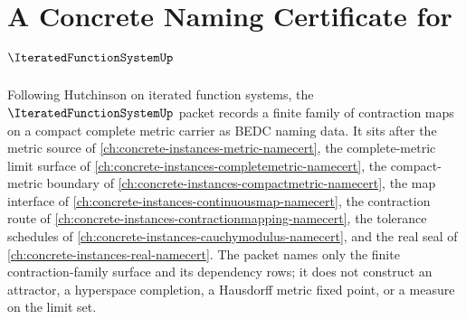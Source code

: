\chapter{A Concrete Naming Certificate for $\IteratedFunctionSystemUp$}
\label{ch:concrete-instances-iterated-function-system-namecert}

Following Hutchinson on iterated function systems, the $\IteratedFunctionSystemUp$ packet records a finite family of contraction maps on a compact complete metric carrier as BEDC naming data. It sits after the metric source of \autoref{ch:concrete-instances-metric-namecert}, the complete-metric limit surface of \autoref{ch:concrete-instances-completemetric-namecert}, the compact-metric boundary of \autoref{ch:concrete-instances-compactmetric-namecert}, the map interface of \autoref{ch:concrete-instances-continuousmap-namecert}, the contraction route of \autoref{ch:concrete-instances-contractionmapping-namecert}, the tolerance schedules of \autoref{ch:concrete-instances-cauchymodulus-namecert}, and the real seal of \autoref{ch:concrete-instances-real-namecert}. The packet names only the finite contraction-family surface and its dependency rows; it does not construct an attractor, a hyperspace completion, a Hausdorff metric fixed point, or a measure on the limit set.

